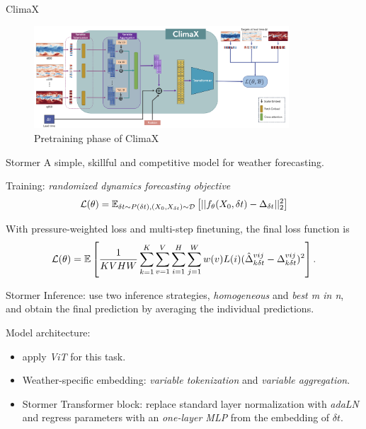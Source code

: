 \documentclass[12pt,aspectratio=169]{beamer}
\begin{document}
\begin{frame}{ClimaX}
  \begin{figure}
    \begin{center}
      \includegraphics[width=0.85\textwidth]{figures/ClimaX.png}
    \end{center}
    \caption{Pretraining phase of ClimaX}\label{fig:1}
  \end{figure}
\end{frame}

\begin{frame}{Stormer}
  A simple, skillful and competitive model for weather forecasting.

  Training: \textit{\color{ECNURed}randomized dynamics forecasting objective}
  $$
    {\cal L}(\theta)=\mathbb{E}_{\delta t\sim P(\delta t),(X_0,X_{\delta t})\sim {\cal D}}
    \left[||f_{\theta}(X_0,\delta t)-\Delta_{\delta t}||_2^2\right]
  $$

  With pressure-weighted loss and multi-step finetuning, the final loss function is
  $$
    {\cal L}(\theta)=\mathbb{E}\left[\frac{1}{KVHW}\sum_{k=1}^K\sum_{v=1}^V
    \sum_{i=1}^H\sum_{j=1}^Ww(v)L(i)(\hat\Delta_{k\delta t}^{vij}-\Delta_{k\delta t}^{vij})^2\right].
  $$
\end{frame}

\begin{frame}{Stormer}
  Inference: use two inference strategies, \textit{\color{ECNURed}homogeneous} and 
  \textit{\color{ECNURed}best m in n}, and obtain the final prediction by averaging the individual predictions.

  Model architecture: 
  \begin{itemize}
    \item apply \textit{\color{ECNURed}ViT} for this task.

    \item Weather-specific embedding: \textit{\color{ECNURed}variable tokenization} and 
    \textit{\color{ECNURed}variable aggregation}.

    \item Stormer Transformer block: replace standard layer normalization with \textit{\color{ECNURed}adaLN} 
    and regress parameters with an \textit{\color{ECNURed}one-layer MLP} from the embedding of $\delta t$.
  \end{itemize}
\end{frame}
\end{document}
